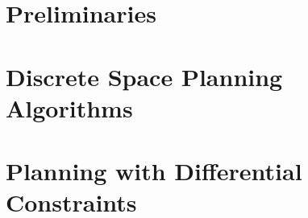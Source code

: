  \section{Preliminaries}
 
 \section{Discrete Space Planning Algorithms}
 
 \section{Planning with Differential Constraints}
